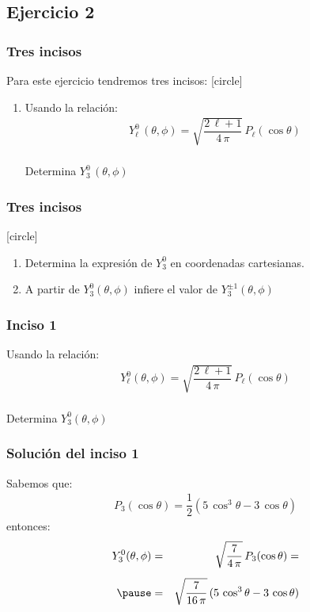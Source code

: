\subsection{Ejercicio 2}
\begin{frame}
\frametitle{Tres incisos}
Para este ejercicio tendremos tres incisos:
[circle]
\begin{enumerate}[<+->]
\item Usando la relación:
\begin{align*}
Y_{\ell}^{0} \, (\theta, \phi) = \sqrt{\dfrac{2 \, \ell + 1}{4 \, \pi}} \, P_{\ell} (\cos \theta)
\end{align*}
\\
\bigskip
Determina $Y_{3}^{0} \, (\theta, \phi)$
\seti
\end{enumerate}
\end{frame}
\begin{frame}
\frametitle{Tres incisos}
[circle]
\begin{enumerate}[<+->]
\conti
\item Determina la expresión de $Y_{3}^{0}$ en coordenadas cartesianas.
\item A partir de $Y_{3}^{0} (\theta, \phi)$ infiere el valor de $Y_{3}^{\pm 1} (\theta, \phi)$
\end{enumerate}
\end{frame}
\begin{frame}
\frametitle{Inciso 1}
Usando la relación:
\begin{align*}
Y_{\ell}^{0} (\theta, \phi) = \sqrt{\dfrac{2 \, \ell + 1}{4 \, \pi}} \, P_{\ell} (\cos \theta)
\end{align*}
\\
\bigskip
\pause
Determina $Y_{3}^{0} (\theta, \phi)$
\end{frame}
\begin{frame}
\frametitle{Solución del inciso 1}
Sabemos que:
\begin{align*}
P_{3} (\cos \theta) = \dfrac{1}{2} (5 \, \cos^{3} \theta - 3 \, \cos \theta)
\end{align*}
\pause
entonces:
\begin{eqnarray*}
Y_{3}^{0} (\theta, \phi) &=& \sqrt{\dfrac{7}{4 \, \pi}} \, P_{3} (\cos \theta) = \\[0.5em] \pause
&=& \sqrt{\dfrac{7}{16 \, \pi}} \, (5 \, \cos^{3} \theta - 3 \, \cos \theta)
\end{eqnarray*}
\end{frame}
